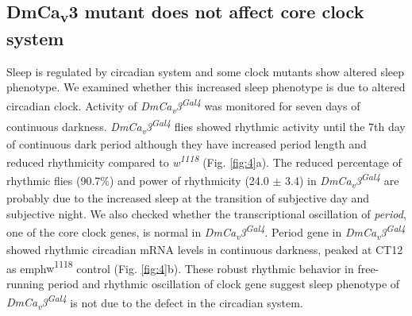 \subsection*{DmCa\textsubscript{v}3 mutant does not affect core clock system}

Sleep is regulated by circadian system and some clock mutants show altered sleep phenotype\cite{12568241, 19038223}.
We examined whether this increased sleep phenotype is due to altered circadian clock.
Activity of \emph{DmCa\textsubscript{v}3\textsuperscript{Gal4}} was monitored for seven days of continuous darkness.
\emph{DmCa\textsubscript{v}3\textsuperscript{Gal4}} flies showed rhythmic activity until the 7th day of continuous dark period although they have increased period length and reduced rhythmicity compared to \emph{w\textsuperscript{1118}} (Fig. \ref{fig:4}a). The reduced percentage of rhythmic flies (90.7\%) and power of rhythmicity (24.0 $\pm$ 3.4) in \emph{DmCa\textsubscript{v}3\textsuperscript{Gal4}} are probably due to the increased sleep at the transition of subjective day and subjective night.
We also checked whether the transcriptional oscillation of \emph{period}, one of the core clock genes, is normal in \emph{DmCa\textsubscript{v}3\textsuperscript{Gal4}}. 
Period gene in \emph{DmCa\textsubscript{v}3\textsuperscript{Gal4}} showed rhythmic circadian mRNA levels in continuous darkness, peaked at CT12 as emph{w\textsuperscript{1118}} control (Fig. \ref{fig:4}b).
These robust rhythmic behavior in free-running period and rhythmic oscillation of clock gene suggest sleep phenotype of \emph{DmCa\textsubscript{v}3\textsuperscript{Gal4}} is not due to the defect in the circadian system. 
    
  
  
  
  
  
  
  
  